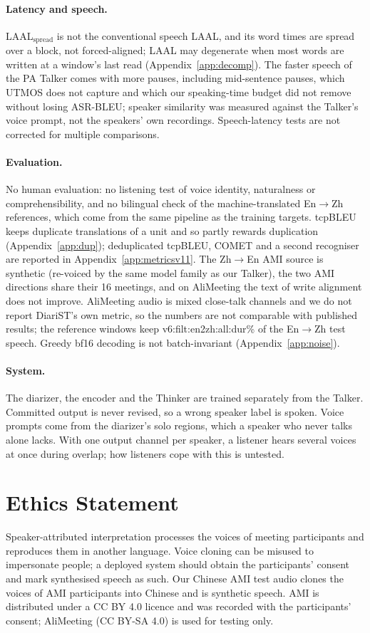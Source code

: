 \paragraph{Latency and speech.} LAAL$_\text{spread}$ is not the conventional speech LAAL, and its word times are spread
over a block, not forced-aligned; LAAL may degenerate when most words are written at a window's last read
(Appendix~\ref{app:decomp}). The faster speech of the PA Talker comes with more pauses, including mid-sentence pauses,
which UTMOS does not capture\ifFluencyPA{} and which our speaking-time budget did not remove without losing
ASR-BLEU\fi; speaker similarity was measured against the Talker's voice prompt, not the speakers' own
recordings. Speech-latency tests are not corrected for multiple comparisons.

\paragraph{Evaluation.} No human evaluation: no listening test of voice identity, naturalness or comprehensibility,
and no bilingual check of the machine-translated En$\rightarrow$Zh references, which come from the same pipeline as the
training targets. tcpBLEU keeps duplicate translations of a unit and so partly rewards duplication
(Appendix~\ref{app:dup})\ifMetricsV{}; deduplicated tcpBLEU, COMET and a second recogniser are reported in
Appendix~\ref{app:metricsv11}\fi. The Zh$\rightarrow$En AMI source is synthetic (re-voiced by the same model family as
our Talker), the two AMI directions share their 16 meetings, and on AliMeeting the text of write alignment does not
improve. AliMeeting audio is mixed close-talk channels and we do not report DiariST's own metric, so the numbers are not
comparable with published results; the reference windows keep \num{v6:filt:en2zh:all:dur}\% of the En$\rightarrow$Zh
test speech. Greedy bf16 decoding is not batch-invariant (Appendix~\ref{app:noise}).

\paragraph{System.} The diarizer, the encoder and the Thinker are trained separately from the Talker. Committed output
is never revised, so a wrong speaker label is spoken. Voice prompts come from the diarizer's solo regions, which a
speaker who never talks alone lacks. With one output channel per speaker, a listener hears several voices at once
during overlap; how listeners cope with this is untested.

\section*{Ethics Statement}

Speaker-attributed interpretation processes the voices of meeting participants and reproduces them in another
language. Voice cloning can be misused to impersonate people; a deployed system should obtain the participants'
consent and mark synthesised speech as such. Our Chinese AMI test audio clones the voices of AMI participants into
Chinese and is synthetic speech. AMI is distributed under a CC BY 4.0 licence and was recorded with the participants'
consent; AliMeeting (CC BY-SA 4.0) is used for testing only.
